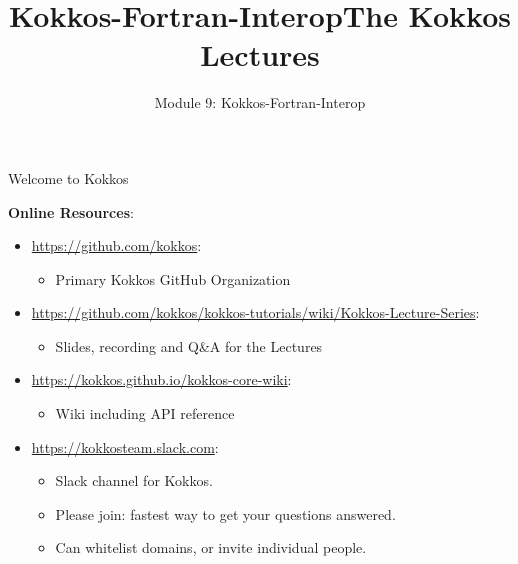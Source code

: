 


\title{Kokkos-Fortran-Interop}
\title{The Kokkos Lectures}

\author{Module 9: Kokkos-Fortran-Interop}



\shortfalse
\mediumfalse
\fullfalse
\notoverviewtrue

\usepackage{minted}



\begin{frame}[fragile]{Welcome to Kokkos}

\textbf{Online Resources}:

\begin{itemize}
        \item \url{https://github.com/kokkos}:
                \begin{itemize}
                        \item Primary Kokkos GitHub Organization
                \end{itemize}
        \item \url{https://github.com/kokkos/kokkos-tutorials/wiki/Kokkos-Lecture-Series}:
                \begin{itemize}
        \item{Slides, recording and Q\&A for the Lectures}
                \end{itemize}
        \item \url{https://kokkos.github.io/kokkos-core-wiki}:
                \begin{itemize}
                        \item Wiki including API reference
                \end{itemize}
        \item \url{https://kokkosteam.slack.com}:
                \begin{itemize}
                        \item Slack channel for Kokkos.
                        \item Please join: fastest way to get your questions answered.
                        \item Can whitelist domains, or invite individual people.
                \end{itemize}
\end{itemize}

\end{frame}

